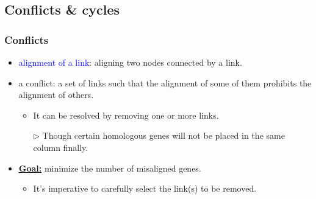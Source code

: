 \documentclass[xcolor=dvipsnames,envcountsect,handout]{beamer}
\begin{document}
\subsection{Conflicts \& cycles}


\begin{frame}
\frametitle{Conflicts}
\begin{itemize}
\item \textcolor{blue}{alignment of a link}: 
aligning two nodes connected by a link.
\vspace{6pt}
\item a \alert{conflict}: a set of links such that the alignment of 
some of them prohibits the alignment of others. 
\vspace{6pt} 
\begin{itemize}
\item It can be resolved by removing one or more links. 
\item [$\rhd$] Though certain homologous genes will not be placed 
in the same column finally. 
\end{itemize}
\vspace{8pt}
\item \underline{\bf Goal:} minimize the number of misaligned genes. 
\begin{itemize}
\item It's imperative to carefully select the link(s) to be removed.
\end{itemize}
\end{itemize}
\end{frame}
\end{document}
